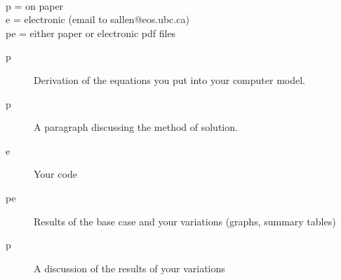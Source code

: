\documentclass[12pt]{article}
\begin{document}
\\
p = on paper\\
e = electronic (email to sallen@eos.ubc.ca)\\
pe = either paper or electronic pdf files
\begin{description}
\item [p] Derivation of the equations you put into your computer model.
\item [p] A paragraph discussing the method of solution.
\item [e] Your code
\item [pe] Results of the base case and your variations (graphs, summary tables)
\item [p] A discussion of the results of your variations
\end{description}
\end{document}
